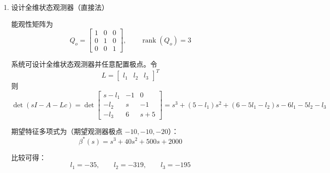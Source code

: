 \begin{example}
\begin{enumerate}
        比较可得：
        \[
        k_1=-2,\qquad k_2=2,\qquad k_3=2
        \]
        因此
        \[
        u=
        \begin{bmatrix}
        -2 & 2 & 2
        \end{bmatrix}x
        \]

        \item 设计全维状态观测器（直接法）

        能观性矩阵为
        \[
        Q_o =
        \begin{bmatrix}
        1 & 0 & 0 \\
        0 & 1 & 0 \\
        0 & 0 & 1
        \end{bmatrix},
        \qquad
        \operatorname{rank}(Q_o)=3
        \]

        系统可设计全维状态观测器并任意配置极点。令
        \[
        L=
        \begin{bmatrix}
        l_1 & l_2 & l_3
        \end{bmatrix}^{T}
        \]
        则
        \[
        \det(sI-A-Lc)
        =
        \det
        \begin{bmatrix}
        s-l_1 & -1 & 0 \\
        -l_2 & s & -1 \\
        -l_3 & 6 & s+5
        \end{bmatrix}
        =
        s^3+(5-l_1)s^2+(6-5l_1-l_2)s-6l_1-5l_2-l_3
        \]

        期望特征多项式为（期望观测器极点 $-10,-10,-20$）：
        \[
        \beta^*(s)=s^3+40s^2+500s+2000
        \]

        比较可得：
        \[
        l_1=-35,\qquad l_2=-319,\qquad l_3=-195
        \]
    \end{enumerate}
\end{example}